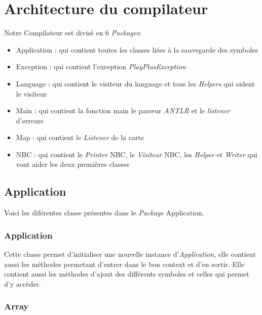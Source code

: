 \section{Architecture du compilateur}


Notre Compilateur est divisé en 6 \emph{Packages}:
\begin{itemize}
    \item Application : qui contient toutes les classes liées à la sauvegarde des symboles
    \item Exception : qui contient l'exception \emph{PlayPlusException}
    \item Language : qui contient le visiteur du language et tous les \emph{Helpers} qui aident le visiteur
    \item Main : qui contient la fonction main le parseur \emph{ANTLR} et le \emph{listener} d'erreurs
    \item Map : qui contient le \emph{Listener} de la carte
    \item NBC : qui contient le \emph{Printer} NBC, le \emph{Visiteur} NBC, les \emph{Helper} et \emph{Writer} qui vont aider les deux premières classes
\end{itemize}

\subsection{Application}

Voici les diférentes classe présentes dans le \emph{Package} Application.

\subsubsection{Application}

Cette classe permet d'initialiser une nouvelle instance d'\emph{Application}, elle contient aussi les méthodes permetant d'entrer dans le bon context et d'en sortir.
Elle contient aussi les méthodes d'ajout des différents symboles et celles qui permet d'y accèder.

\subsubsection{Array}

